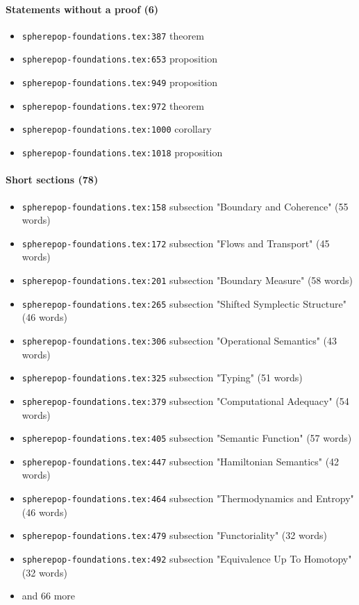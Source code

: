 \documentclass[11pt]{article}
\newcommand{\loc}[1]{{\small\color{muted}\texttt{#1}}}
\begin{document}
\paragraph{Statements without a proof (6)}
\begin{itemize}
\item \loc{spherepop-foundations.tex:387} theorem
\item \loc{spherepop-foundations.tex:653} proposition
\item \loc{spherepop-foundations.tex:949} proposition
\item \loc{spherepop-foundations.tex:972} theorem
\item \loc{spherepop-foundations.tex:1000} corollary
\item \loc{spherepop-foundations.tex:1018} proposition
\end{itemize}
\paragraph{Short sections (78)}
\begin{itemize}
\item \loc{spherepop-foundations.tex:158} subsection "Boundary and Coherence" (55 words)
\item \loc{spherepop-foundations.tex:172} subsection "Flows and Transport" (45 words)
\item \loc{spherepop-foundations.tex:201} subsection "Boundary Measure" (58 words)
\item \loc{spherepop-foundations.tex:265} subsection "Shifted Symplectic Structure" (46 words)
\item \loc{spherepop-foundations.tex:306} subsection "Operational Semantics" (43 words)
\item \loc{spherepop-foundations.tex:325} subsection "Typing" (51 words)
\item \loc{spherepop-foundations.tex:379} subsection "Computational Adequacy" (54 words)
\item \loc{spherepop-foundations.tex:405} subsection "Semantic Function" (57 words)
\item \loc{spherepop-foundations.tex:447} subsection "Hamiltonian Semantics" (42 words)
\item \loc{spherepop-foundations.tex:464} subsection "Thermodynamics and Entropy" (46 words)
\item \loc{spherepop-foundations.tex:479} subsection "Functoriality" (32 words)
\item \loc{spherepop-foundations.tex:492} subsection "Equivalence Up To Homotopy" (32 words)
\item[] {\color{muted}\small and 66 more}
\end{itemize}
\end{document}
